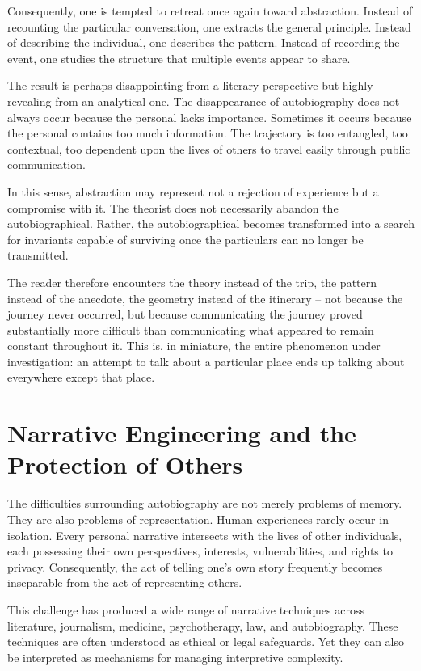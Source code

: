 \documentclass[11pt]{article}
\theoremstyle{plain}
\begin{document}
Consequently, one is tempted to retreat once again toward abstraction. Instead of recounting the particular conversation, one extracts the general principle. Instead of describing the individual, one describes the pattern. Instead of recording the event, one studies the structure that multiple events appear to share.

The result is perhaps disappointing from a literary perspective but highly revealing from an analytical one. The disappearance of autobiography does not always occur because the personal lacks importance. Sometimes it occurs because the personal contains too much information. The trajectory is too entangled, too contextual, too dependent upon the lives of others to travel easily through public communication.

In this sense, abstraction may represent not a rejection of experience but a compromise with it. The theorist does not necessarily abandon the autobiographical. Rather, the autobiographical becomes transformed into a search for invariants capable of surviving once the particulars can no longer be transmitted.

The reader therefore encounters the theory instead of the trip, the pattern instead of the anecdote, the geometry instead of the itinerary -- not because the journey never occurred, but because communicating the journey proved substantially more difficult than communicating what appeared to remain constant throughout it. This is, in miniature, the entire phenomenon under investigation: an attempt to talk about a particular place ends up talking about everywhere except that place.

\section{Narrative Engineering and the Protection of Others}

The difficulties surrounding autobiography are not merely problems of memory. They are also problems of representation. Human experiences rarely occur in isolation. Every personal narrative intersects with the lives of other individuals, each possessing their own perspectives, interests, vulnerabilities, and rights to privacy. Consequently, the act of telling one's own story frequently becomes inseparable from the act of representing others.

This challenge has produced a wide range of narrative techniques across literature, journalism, medicine, psychotherapy, law, and autobiography. These techniques are often understood as ethical or legal safeguards. Yet they can also be interpreted as mechanisms for managing interpretive complexity.
\end{document}
